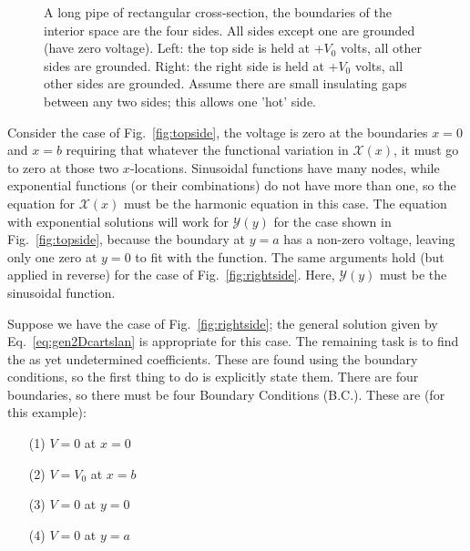 \documentclass[12pt]{article}
\begin{document}
\begin{flushleft}
\begin{figure}[h]
\begin{center}
\hspace{0.2in}
\end{center}
\caption{\small A long pipe of rectangular cross-section, the boundaries of the interior space are the four sides.  All sides except one are grounded (have zero voltage).  Left: the top side is held at +$V_{0}$ volts, all other sides are grounded.  Right: the right side is held at +$V_{0}$ volts, all other sides are grounded.  Assume there are small insulating gaps between any two sides; this allows one 'hot' side.}
\label{fig:staticguide}
\end{figure}
 
Consider the case of Fig.~\ref{fig:topside}, the voltage is zero at the boundaries $x=0$ and $x=b$ requiring that  whatever the functional variation in $\mathcal{X}(x)$, it must go to zero at those two $x$-locations.  Sinusoidal functions have many nodes, while exponential functions (or their combinations) do not have more than one, so the equation for $\mathcal{X}(x)$ must be the harmonic equation in this case.   The equation with exponential solutions will work for $\mathcal{Y}(y)$ for the case shown in Fig.~\ref{fig:topside}, because the boundary at $y=a$ has a non-zero voltage, leaving only one zero at $y=0$ to fit with the function.  The same arguments hold (but applied in reverse) for the case of Fig.~\ref{fig:rightside}.  Here, $\mathcal{Y}(y)$ must be the sinusoidal function.

Suppose we have the case of Fig.~\ref{fig:rightside}; the general solution given by Eq.~\ref{eq:gen2Dcartslan} is appropriate for this case.  The remaining task is to find the as yet undetermined coefficients.  These are found using the boundary conditions, so the first thing to do is explicitly state them.  There are four boundaries, so there must be four Boundary Conditions (B.C.).  These are (for this example):
\begin{itemize}
\item[(1)] $V=0$ at $x=0$
\item[(2)] $V=V_{0}$ at $x=b$
\item[(3)] $V=0$ at $y=0$
\item[(4)] $V=0$ at $y=a$
\end{itemize}


\end{flushleft}
\end{document}
